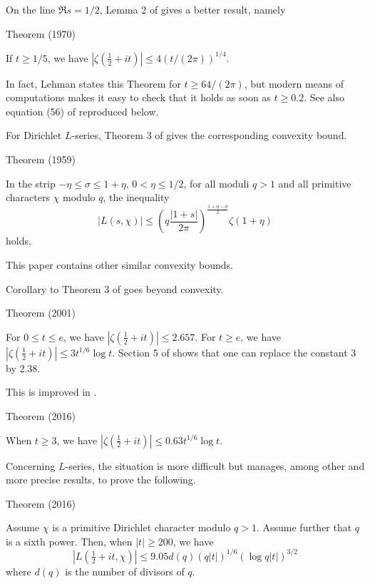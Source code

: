 On the line $\Re s=1/2$, Lemma 2 of
\cite{Lehman*70} gives a better
result, namely
\par 
\begin{thm}{Theorem (1970)}

If $t\ge 1/5$, we have
$
|\zeta(\tfrac12+it)|\le 4 (t/(2\pi))^{1/4}
$.
\end{thm}

In fact, Lehman states this Theorem for $t\ge 64/(2\pi)$, but modern means of
computations makes it easy to check that it holds as soon as $t\ge 0.2$.
See also equation (56)
of \cite{Backlund*18} reproduced below.

For Dirichlet $L$-series, Theorem 3
of \cite{Rademacher*59} gives 
the corresponding convexity bound.
\par 
\begin{thm}{Theorem (1959)}

In the strip $-\eta\le \sigma\le 1+\eta$, $0 < \eta\le 1/2$, for all moduli $q
> 1$ and all primitive
characters $\chi$ modulo $q$, the inequality 
$$
|L(s,\chi)|\le  
\left(q\frac{|1+s|}{2\pi}\right)^{\frac{1+\eta-\sigma}{2}}
\zeta(1+\eta)
$$
holds.
\end{thm}

This paper contains other similar convexity bounds.


Corollary to Theorem 3
of \cite{Cheng-Graham*01} goes beyond convexity. 

\par 
\begin{thm}{Theorem (2001)}

  For $0\le t\le e$, we have $|\zeta(\tfrac12+it)|\le 2.657$. For $t\ge e$, we
  have $|\zeta(\tfrac12+it)|\le 3t^{1/6}\log t$.
  Section 5 of \cite{Trudgian*13}
  shows that one can replace the constant 3 by 2.38.
\end{thm}


This is improved in
\cite{Hiary*16}.
\par 
\begin{thm}{Theorem (2016)}

  When $t\ge 3$, we
  have $|\zeta(\tfrac12+it)|\le 0.63t^{1/6}\log t$.
\end{thm}


Concerning $L$-series, the situation is more difficult but
\cite{Hiary*16b}
manages, among other and more precise results, to prove the following.
\par 
\begin{thm}{Theorem (2016)}

  Assume $\chi$ is a primitive Dirichlet character modulo $q>1$. Assume
  further that $q$ is a sixth power. Then, when $|t|\ge 200$, we
    have
    $$|L(\tfrac12+it,\chi)|\le 9.05d(q) (q|t|)^{1/6}(\log
    q|t|)^{3/2}$$
    where $d(q)$ is the number of divisors of $q$.
\end{thm}


